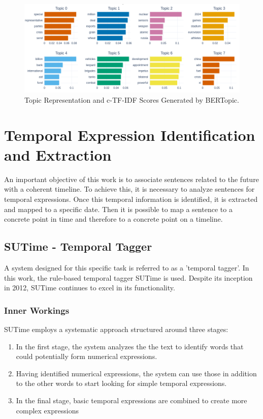 \documentclass[12pt,oneside,bibtotoc,liststotoc]{scrbook}
\begin{document}
\begin{figure}
  \centering
  \includegraphics[width=15cm]{img/topic_representation.png}
  \caption{Topic Representation and c-TF-IDF Scores Generated by BERTopic.}
  \label{fig:topic_representation}
\end{figure}


\chapter{Temporal Expression Identification and Extraction}
An important objective of this work is to associate sentences related to the future with a coherent timeline. To achieve this, it is necessary to analyze sentences for temporal expressions. Once this temporal information is identified, it is extracted and mapped to a specific date. Then it is possible to map a sentence to a concrete point in time and therefore to a concrete point on a timeline.

\section{SUTime - Temporal Tagger}
A system designed for this specific task is referred to as a 'temporal tagger'. In this work, the rule-based temporal tagger SUTime \cite{sutime} is used. Despite its inception in 2012, SUTime continues to excel in its functionality.

\subsection{Inner Workings}
SUTime employs a systematic approach structured around three stages:

\begin{enumerate}
  \item In the first stage, the system analyzes the the text to identify words that could potentially form numerical expressions.

  \item Having identified numerical expressions, the system can use those in addition to the other words to start looking for simple temporal expressions.

  \item In the final stage, basic temporal expressions are combined to create more complex expressions
\end{enumerate}
\end{document}
